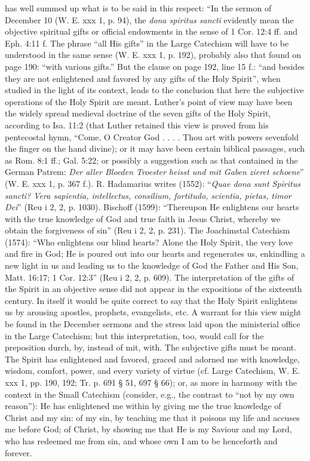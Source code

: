 has well summed up what is to be said in this respect: “In the sermon of December 10 (W. E. xxx 1, p. 94), the \emph{dona spiritus sancti} evidently mean the objective spiritual gifts or official endowments in the sense of 1 Cor. 12:4 ff. and Eph. 4:11 f. The phrase “all His gifts” in the Large Catechism will have to be understood in the same sense (W. E. xxx 1, p. 192), probably also that found on page 190: “with various gifts.” But the clause on page 192, line 15 f.: “and besides they are not enlightened and favored by any gifts of the Holy Spirit”, when studied in the light of its context, leads to the conclusion that here the subjective operations of the Holy Spirit are meant. Luther’s point of view may have been the widely spread medieval doctrine of the seven gifts of the Holy Spirit, according to Isa. 11:2 (that Luther retained this view is proved from his pentecostal hymn, “Come, O Creator God . . . . Thou art with powers sevenfold the finger on the hand divine); or it may have been certain biblical passages, such as Rom. 8:1 ff.; Gal. 5:22; or possibly a suggestion such as that contained in the German Patrem: \emph{Der aller Bloeden Troester heisst und mit Gaben zieret schoene}” (W. E. xxx 1, p. 367 f.). R. Hadamarius writes (1552): “\emph{Quae dona sunt Spiritus sancti? Vera sapientia, intellectus, consilium, fortitudo, scientia, pietas, timor Dei}” (Reu i 2, 2, p. 1030). Bischoff (1599): “Thereupon He enlightens our hearts with the true knowledge of God and true faith in Jesus Christ, whereby we obtain the forgiveness of sin” (Reu i 2, 2, p. 231). The Joachimstal Catechism (1574): “Who enlightens our blind hearts? Alone the Holy Spirit, the very love and fire in God; He is poured out into our hearts and regenerates us, enkindling a new light in us and leading us to the knowledge of God the Father and His Son, Matt. 16:17; 1 Cor. 12:3” (Reu i 2, 2, p. 609). The interpretation of the gifts of the Spirit in an objective sense did not appear in the expositions of the sixteenth century. In itself it would be quite correct to say that the Holy Spirit enlightens us by arousing apostles, prophets, evangelists, etc. A warrant for this view might be found in the December sermons and the stress laid upon the ministerial office in the Large Catechism; but this interpretation, too, would call for the preposition durch, by, instead of mit, with. The subjective gifts must be meant. The Spirit has enlightened and favored, graced and adorned me with knowledge, wisdom, comfort, power, and every variety of virtue (cf. Large Catechism, W. E. xxx 1, pp. 190, 192; Tr. p. 691 § 51, 697 § 66); or, as more in harmony with the context in the Small Catechism (consider, e.g., the contrast to
“not by my own reason”): He has enlightened me within by giving me the true knowledge of Christ and my sin: of my sin, by teaching me that it poisons my life and accuses me before God; of Christ, by showing me that He is my Saviour and my Lord, who has redeemed me from sin, and whose own I am to be henceforth and forever.


